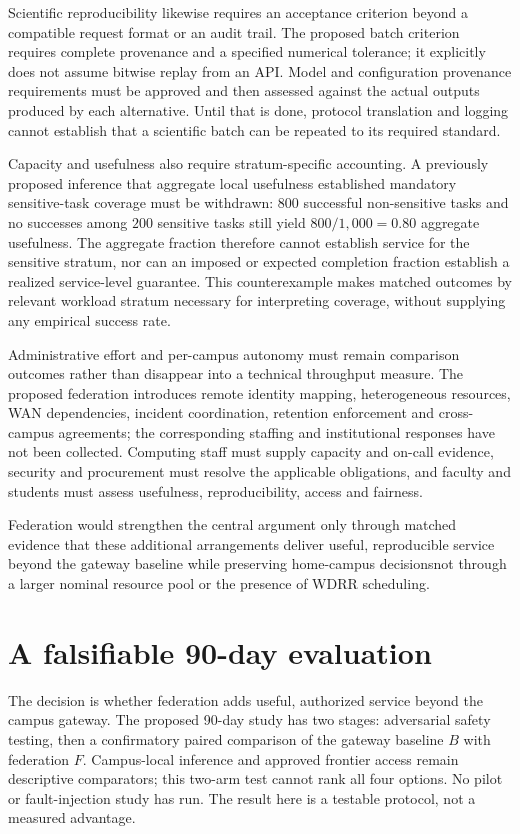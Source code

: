\documentclass[11pt]{article}
\begin{document}
Scientific reproducibility likewise requires an acceptance criterion beyond a compatible request format or an audit trail. The proposed batch criterion requires complete provenance and a specified numerical tolerance; it explicitly does not assume bitwise replay from an API. Model and configuration provenance requirements must be approved and then assessed against the actual outputs produced by each alternative. Until that is done, protocol translation and logging cannot establish that a scientific batch can be repeated to its required standard.

Capacity and usefulness also require stratum-specific accounting. A previously proposed inference that aggregate local usefulness established mandatory sensitive-task coverage must be withdrawn: $800$ successful non-sensitive tasks and no successes among $200$ sensitive tasks still yield $800/1{,}000 = 0.80$ aggregate usefulness. The aggregate fraction therefore cannot establish service for the sensitive stratum, nor can an imposed or expected completion fraction establish a realized service-level guarantee. This counterexample makes matched outcomes by relevant workload stratum necessary for interpreting coverage, without supplying any empirical success rate.

Administrative effort and per-campus autonomy must remain comparison outcomes rather than disappear into a technical throughput measure. The proposed federation introduces remote identity mapping, heterogeneous resources, WAN dependencies, incident coordination, retention enforcement and cross-campus agreements; the corresponding staffing and institutional responses have not been collected. Computing staff must supply capacity and on-call evidence, security and procurement must resolve the applicable obligations, and faculty and students must assess usefulness, reproducibility, access and fairness.

Federation would strengthen the central argument only through matched evidence that these additional arrangements deliver useful, reproducible service beyond the gateway baseline while preserving home-campus decisions\textemdash{}not through a larger nominal resource pool or the presence of WDRR scheduling.

\section{A falsifiable 90-day evaluation}
The decision is whether federation adds useful, authorized service beyond the campus gateway. The proposed 90-day study has two stages: adversarial safety testing, then a confirmatory paired comparison of the gateway baseline $B$ with federation $F$. Campus-local inference and approved frontier access remain descriptive comparators; this two-arm test cannot rank all four options. No pilot or fault-injection study has run. The result here is a testable protocol, not a measured advantage.
\end{document}
